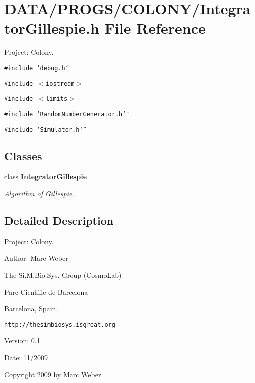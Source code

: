 \section{DATA/PROGS/COLONY/IntegratorGillespie.h File Reference}
\label{IntegratorGillespie_8h}
Project: Colony. 

{\tt \#include \char`\"{}debug.h\char`\"{}}\par
{\tt \#include $<$iostream$>$}\par
{\tt \#include $<$limits$>$}\par
{\tt \#include \char`\"{}RandomNumberGenerator.h\char`\"{}}\par
{\tt \#include \char`\"{}Simulator.h\char`\"{}}\par
\subsection*{Classes}
\begin{CompactItemize}
\item 
class {\bf IntegratorGillespie}
\begin{CompactList}\small\item\em Algorithm of Gillespie. \item\end{CompactList}\end{CompactItemize}


\subsection{Detailed Description}
Project: Colony. 

\begin{Desc}
\item[Author:]Marc Weber\par
 The Si.M.Bio.Sys. Group (CosmoLab)\par
 Parc Científic de Barcelona\par
 Barcelona, Spain.\par
 {\tt http://thesimbiosys.isgreat.org} \end{Desc}
\begin{Desc}
\item[Version:]0.1 \end{Desc}
\begin{Desc}
\item[Date:]11/2009\end{Desc}
Copyright 2009 by Marc Weber 